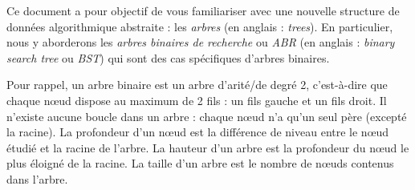 \documentclass[11pt,a4paper]{article}
\begin{document}
\EncadreTitre

\bigskip


%
%

\bigskip


Ce document a pour objectif de vous familiariser avec une nouvelle structure de données algorithmique abstraite : les \textit{arbres} (en anglais : \textit{trees}).
En particulier, nous y aborderons les \textit{arbres binaires de recherche} ou \textit{ABR} (en anglais : \textit{binary search tree} ou \textit{BST}) qui sont des cas spécifiques d'arbres binaires.

\bigskip

Pour rappel, un arbre binaire est un arbre d'arité/de degré 2, c'est-à-dire que chaque nœud dispose au maximum de 2 fils : un fils gauche et un fils droit.
Il n'existe aucune boucle dans un arbre : chaque nœud n'a qu'un seul père (excepté la racine).
La profondeur d'un nœud est la différence de niveau entre le nœud étudié et la racine de l'arbre.
La hauteur d'un arbre est la profondeur du nœud le plus éloigné de la racine.
La taille d'un arbre est le nombre de nœuds contenus dans l'arbre.

\bigskip


\end{document}
